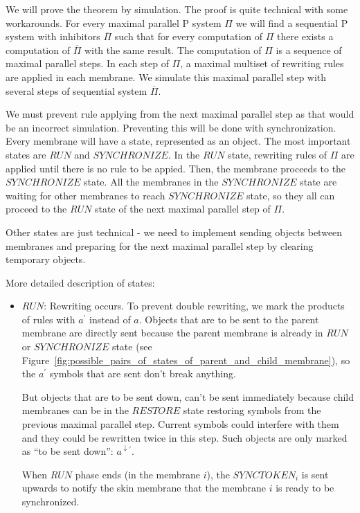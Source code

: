 \begin{dokaz}
  We will prove the theorem by simulation.
  The proof is quite technical with some workarounds.
  For every maximal parallel P system $\Pi$ we will find a sequential P system with inhibitors $\overline{\Pi}$ such that for every computation of $\Pi$ there exists a computation of $\overline{\Pi}$ with the same result.
  The computation of $\Pi$ is a sequence of maximal parallel steps.
  In each step of $\Pi$, a maximal multiset of rewriting rules are applied in each membrane.
  We simulate this maximal parallel step with several steps of sequential system $\overline{\Pi}$.

  We must prevent rule applying from the next maximal parallel step as that would be an incorrect simulation.
  Preventing this will be done with synchronization.
  Every membrane will have a state, represented as an object.
  The most important states are $RUN$ and $SYNCHRONIZE$.
  In the $RUN$ state, rewriting rules of $\Pi$ are applied until there is no rule to be appied. Then, the membrane proceeds to the $SYNCHRONIZE$ state.
  All the membranes in the $SYNCHRONIZE$ state are waiting for other membranes to reach $SYNCHRONIZE$ state, so they all can proceed to the $RUN$ state of the next maximal parallel step of $\Pi$.

  Other states are just technical - we need to implement sending objects between membranes and preparing for the next maximal parallel step by clearing temporary objects.

  More detailed description of states:
  

  \begin{itemize}
    \item $RUN$: Rewriting occurs.
    To prevent double rewriting, we mark the products of rules with $a^{\prime}$ instead of $a$.
    Objects that are to be sent to the parent membrane are directly sent because the parent membrane is already in $RUN$ or $SYNCHRONIZE$ state (see Figure~\ref{fig:possible_pairs_of_states_of_parent_and_child_membrane}), so the $a^{\prime}$ symbols that are sent don't break anything.
    
    But objects that are to be sent down, can't be sent immediately because child membranes can be in the $RESTORE$ state restoring symbols from the previous maximal parallel step. Current symbols could interfere with them and they could be rewritten twice in this step. Such objects are only marked as ``to be sent down'': $a^{\downarrow\prime}$.

    When $RUN$ phase ends (in the membrane $i$), the $SYNCTOKEN_i$ is sent upwards to notify the skin membrane that the membrane $i$ is ready to be synchronized.


\end{itemize}
\end{dokaz}
